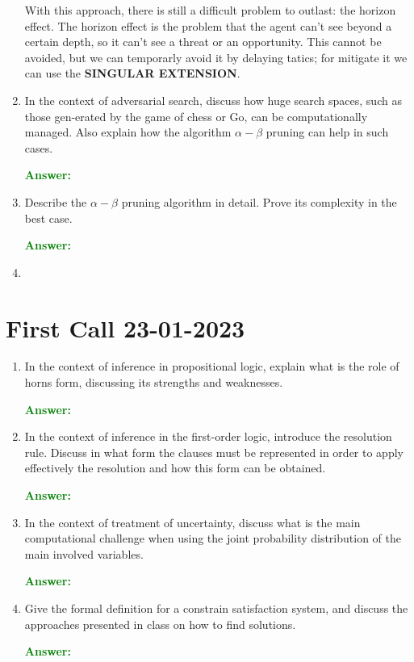 \documentclass[12pt]{article}
\begin{document}
\begin{enumerate}[label=\textbf{AS.\arabic*}]
    With this approach, there is still a difficult problem to outlast: the horizon effect.
    The horizon effect is the problem that the agent can't see beyond a certain depth, so it can't see a threat or an opportunity.
    This cannot be avoided, but we can temporarly avoid it by delaying tatics; for mitigate it we can use the \textbf{SINGULAR EXTENSION}.

    \item In the context of adversarial search, discuss how huge search spaces, such as those gen-erated by the game of chess or Go, can be computationally managed.
    Also explain how the algorithm $\alpha - \beta$ pruning can help in such cases.

    \textcolor{green}{\textbf{Answer:}}

    \item Describe the $\alpha - \beta$ pruning algorithm in detail. Prove its complexity in the best case.
    
    \textcolor{green}{\textbf{Answer:}}

    \item 


\end{enumerate}

\section{First Call 23-01-2023}
\begin{enumerate}[label=\textbf{A.\arabic*}]
    \item In the context of inference in propositional logic, explain what is the role of horns form, discussing its strengths and weaknesses.
    
    \textcolor{green}{\textbf{Answer:}}

    \item In the context of inference in the first-order logic, introduce the resolution rule. 
    Discuss in what form the clauses must be represented in order to apply effectively the resolution and how this form can be obtained.\label{l}

    \textcolor{green}{\textbf{Answer:}}
    
    \item In the context of treatment of uncertainty, discuss what is the main computational challenge when using the joint probability distribution of the main involved variables.
    
    \textcolor{green}{\textbf{Answer:}}

    \item Give the formal definition for a constrain satisfaction system, and discuss the approaches presented in class on how to find solutions.
    
    \textcolor{green}{\textbf{Answer:}}

\end{enumerate}
\end{document}
